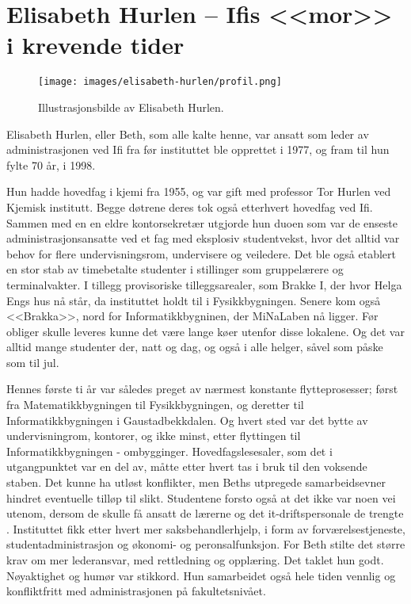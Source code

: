 \chapter[Elisabeth Hurlen]{Elisabeth Hurlen – Ifis <<mor>> i krevende tider}

\author{Skrevet av Narve Trædal}

\begin{wrapfigure}{l}{6.5cm}
	\centering
	\texttt{[image: images/elisabeth-hurlen/profil.png]}
	\label{fig:elisabeth-hurlen}
	\caption{Illustrasjonsbilde av Elisabeth Hurlen.}
\end{wrapfigure}

Elisabeth Hurlen, eller Beth, som alle kalte henne, var ansatt som leder av administrasjonen ved Ifi fra før instituttet ble opprettet i 1977, og fram til hun fylte 70 år, i 1998.

Hun hadde hovedfag i kjemi fra 1955, og var gift med professor Tor Hurlen ved Kjemisk institutt. Begge døtrene deres tok også etterhvert hovedfag ved Ifi. Sammen med en en eldre kontorsekretær utgjorde hun duoen som var de enseste administrasjonsansatte ved et fag med eksplosiv studentvekst, hvor det alltid var behov for flere undervisningsrom, undervisere og veiledere. Det ble også etablert en stor stab av timebetalte studenter i stillinger som gruppelærere og terminalvakter. I tillegg provisoriske tilleggsarealer, som Brakke I, der hvor Helga Engs hus nå står, da instituttet holdt til i Fysikkbygningen. Senere kom også <<Brakka>>, nord for Informatikkbygninen, der MiNaLaben nå ligger. Før obliger skulle leveres kunne det være lange køer utenfor disse lokalene. Og det var alltid mange studenter der, natt og dag, og også i alle helger, såvel som påske som til jul.

Hennes første ti år var således preget av nærmest konstante flytteprosesser; først fra Matematikkbygningen til Fysikkbygningen, og deretter til Informatikkbygningen i Gaustadbekkdalen. Og hvert sted var det bytte av undervisningrom, kontorer, og ikke minst, etter flyttingen til Informatikkbygningen - ombygginger. Hovedfagslesesaler, som det i utgangpunktet var en del av, måtte etter hvert tas i bruk til den voksende staben. Det kunne ha utløst konflikter, men Beths utpregede samarbeidsevner hindret eventuelle tilløp til slikt. Studentene forsto også at det ikke var noen vei utenom, dersom de skulle få ansatt de lærerne og det it-driftspersonale de trengte . Instituttet fikk etter hvert mer saksbehandlerhjelp, i form av forværelsestjeneste, studentadministrasjon og økonomi- og peronsalfunksjon. For Beth stilte det større krav om mer lederansvar, med rettledning og opplæring. Det taklet hun godt. Nøyaktighet og humør var stikkord. Hun samarbeidet også hele tiden vennlig og konfliktfritt med administrasjonen på fakultetsnivået.


